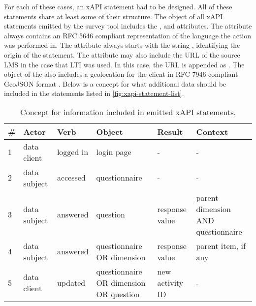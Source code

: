     For each of these cases, an xAPI statement had to be designed.
    All of these statements share at least some of their structure.
    The  object of all xAPI statements emitted by the survey
    tool includes the ,  and 
     attributes. The  attribute always
    contains an RFC 5646 \cite{rfc-5646}
    compliant representation of the language the action was performed
    in. The  attribute always starts with the
    string , identifying the origin of the statement.
    The  attribute may also include the URL
    of the source LMS in the case that LTI was used. In this case,
    the URL is appended as .
    The  object of the  also
    includes a geolocation for the client in RFC 7946 compliant GeoJSON
    format \cite{rfc-7946}.
    Below is a concept for what additional data should be included in 
    the statements listed in \ref{fig:xapi-statement-list}.

    \begin{table}[h]
        \begin{tabularx}{\textwidth}{|l|l|l|X|X|X|}
            \hline
            \# & Actor & Verb & Object & Result & Context \\ 
            \hline \hline
            1 & data client & logged in & login page & - & - \\ 
            2 & data subject & accessed & questionnaire & - & - \\ 
            3 & data subject & answered & question & response value & parent dimension AND questionnaire  \\ 
            4 & data subject & answered & questionnaire OR dimension & response value & parent item, if any \\ 
            5 & data client & updated & questionnaire OR dimension OR question & new activity ID & - \\ 
            \hline
        \end{tabularx}
        \caption{Concept for information included in emitted xAPI statements.}
        \label{table:xapi-data-concept}
    \end{table}

